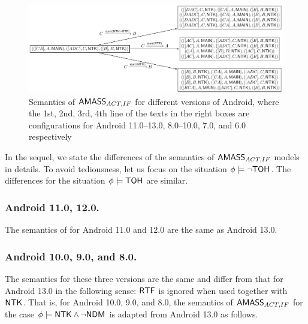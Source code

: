 \begin{example}
\begin{figure}[htbp]
\centering
        \includegraphics[scale = 0.7]{and-example.pdf}
\caption{Semantics of $\textsf{AMASS}_{ACT,IF}$ for different versions of Android, where the 1st, 2nd, 3rd, 4th line of the texts in the right boxes are configurations for Android 11.0--13.0, 8.0--10.0, 7.0, and 6.0 respectively}
    \label{fig-diff-version}
\end{figure}
\end{example}
%

In the sequel, we state the differences of the semantics of {$\textsf{AMASS}_{ACT,IF}$} models in details. To avoid tediousness, let us focus on the situation $\phi \models \neg {\sf TOH}$. The differences for the situation $\phi \models {\sf TOH}$ are similar. 

\subsubsection{Android 11.0, 12.0.}
The semantics of {\AMASS} for Android 11.0 and 12.0 are the same as Android 13.0. 

\subsubsection{Android 10.0, 9.0, and 8.0.}
The semantics for these three versions are the same and differ from that for Android 13.0 in the following sense: ${\sf RTF}$ is ignored when used together with ${\sf NTK}$. 
That is, for Android 10.0, 9.0, and 8.0, the semantics of $\textsf{AMASS}_{ACT,IF}$ for the case $\phi  \models {\sf NTK} \wedge \neg {\sf NDM}$ is adapted from Android 13.0 as follows.


